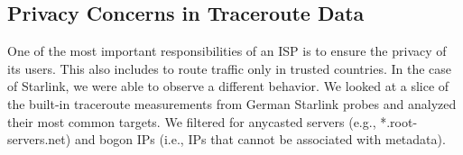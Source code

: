 
\subsection*{Privacy Concerns in Traceroute Data}

One of the most important responsibilities of an \ac{ISP} is to ensure the
privacy of its users. This also includes to route traffic only in trusted
countries. In the case of Starlink, we were able to observe a different
behavior. We looked at a slice of the built-in traceroute measurements from
German Starlink probes and analyzed their most common targets. We filtered for
anycasted servers (e.g., *.root-servers.net) and bogon IPs (i.e., IPs that
cannot be associated with metadata).

